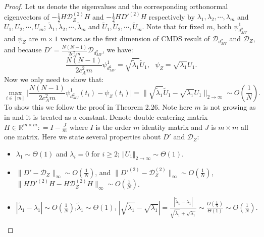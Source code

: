 \documentclass[12pt]{article}
\newcommand{\RR}{\mathbb{R}}
\theoremstyle{definition}
\begin{document}
\begin{proof}
Let us denote the eigenvalues and the corresponding orthonormal eigenvectors of $-\frac{1}{2}H\mathcal{D}^{(2)}_ZH$ and $-\frac{1}{2}HD'^{(2)}H$ respectively by $\lambda_1, \lambda_2, \cdots, \lambda_m$ and $U_1,U_2,\cdots,U_m$; $\tilde{\lambda}_1, \tilde{\lambda}_2,\cdots, \tilde{\lambda}_m$ and $\tilde{U}_1,\tilde{U}_2,\cdots,\tilde{U}_m$.  
Note that for fixed $m$, both $\psi^1_{d^2_{MV}}$ and $\psi_Z$ are $m \times 1$ vectors as the first dimension of CMDS result of $\mathcal{D}_{d^2_{MV}}$ and $\mathcal{D}_Z$, and because $D' = \frac{N(N-1)}{2c_A^2m} \mathcal{D}_{d^2_{MV}}$,
we have:
$$
\frac{N(N-1)}{2c_A^2m}\psi^1_{d^2_{MV}} = \sqrt{\tilde{\lambda}_1} \tilde{U}_1, ~~~ \psi_Z = \sqrt{\lambda_1} U_1.
$$
Now we only need to show that: 
$$
\max_{i \in [m]}\bigg| \frac{N(N-1)}{2c_A^2m}\psi^1_{d^2_{MV}}(t_i) -  \psi_Z(t_i) \bigg| = \bigg\| \sqrt{\tilde{\lambda}_1} \tilde{U}_1 - \sqrt{\lambda_1} U_1\bigg\|_{2 \to \infty} \sim O\left(\frac{1}{N}\right).
$$
To show this we follow the proof in \cite{chen2024euclidean} Theorem 2.26. Note here $m$ is not growing as in \cite{chen2024euclidean} and it is treated as a constant. Denote  double centering matrix $H \in \RR^{m \times m} : = I -\frac{J}{m}$ where $I$ is the order $m$ identity matrix and $J$ is $m\times m$ all one matrix. Here we state several properties about $D'$ and $\mathcal{D}_Z$:
\begin{itemize}
    \item $\lambda_1 \sim \Theta(1)$ and $\lambda_i =0$ for $i \geq 2$; $ \left\Vert U_1 \right\Vert_{2 \to \infty} \sim \Theta(1)$.
    \item $\|D' -\mathcal{D}_Z\|_{\infty} \sim O\left(\frac{1}{N}\right)$, and $\|D'^{(2)} -\mathcal{D}_Z^{(2)}\|_{\infty} \sim O\left(\frac{1}{N}\right)$, $\|HD'^{(2)}H -H\mathcal{D}_Z^{(2)}H\|_{\infty} \sim O\left(\frac{1}{N}\right)$.
    \item $\left|\tilde{\lambda}_1-\lambda_1\right| \sim O\left(\frac{1}{N}\right)$,$\tilde{\lambda}_1 \sim \Theta(1)$, $\left|\sqrt{\tilde{\lambda}_1} -\sqrt{\lambda_1}\right| = \frac{\left|\tilde{\lambda}_1-\lambda_1\right|}{\sqrt{\tilde{\lambda}_1}+\sqrt{\lambda_1}} \sim \frac{O\left(\frac{1}{N}\right)}{\Theta\left(1\right)}  \sim O\left(\frac{1}{N}\right).$
\end{itemize}


\end{proof}
\end{document}

